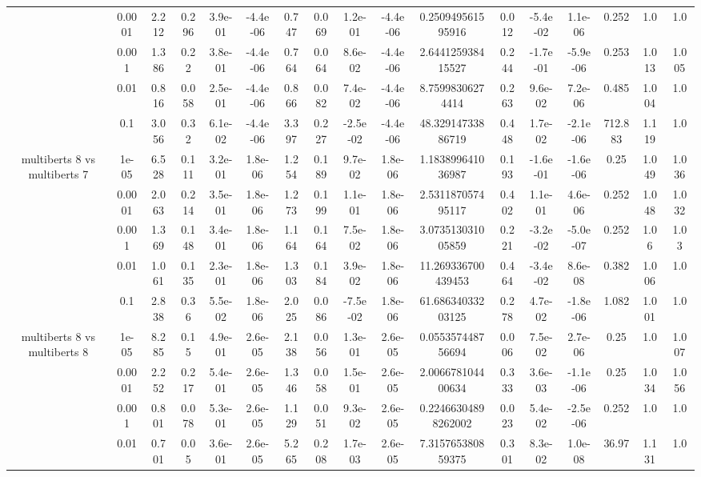 \begin{tabular}{|c|c|c|c|c|c|c|c|c|c|c|c|c|c|c|c|c|}
 & 0.0001 & 2.212 & 0.296 & 3.9e-01 & -4.4e-06 & 0.747 & 0.069 & 1.2e-01 & -4.4e-06 & 0.250949561595916 & 0.012 & -5.4e-02 & 1.1e-06 & 0.252 & 1.0 & 1.0 \\
 & 0.001 & 1.386 & 0.22 & 3.8e-01 & -4.4e-06 & 0.764 & 0.064 & 8.6e-02 & -4.4e-06 & 2.644125938415527 & 0.244 & -1.7e-01 & -5.9e-06 & 0.253 & 1.013 & 1.005 \\
 & 0.01 & 0.816 & 0.058 & 2.5e-01 & -4.4e-06 & 0.866 & 0.082 & 7.4e-02 & -4.4e-06 & 8.75998306274414 & 0.263 & 9.6e-02 & 7.2e-06 & 0.485 & 1.004 & 1.0 \\
 & 0.1 & 3.056 & 0.32 & 6.1e-02 & -4.4e-06 & 3.397 & 0.227 & -2.5e-02 & -4.4e-06 & 48.32914733886719 & 0.448 & 1.7e-02 & -2.1e-06 & 712.883 & 1.119 & 1.0 \\
\hline
\multirow{5}{*}{multiberts 8 vs multiberts 7} & 1e-05 & 6.528 & 0.111 & 3.2e-01 & 1.8e-06 & 1.254 & 0.189 & 9.7e-02 & 1.8e-06 & 1.183899641036987 & 0.193 & -1.6e-01 & -1.6e-06 & 0.25 & 1.049 & 1.036 \\
 & 0.0001 & 2.063 & 0.214 & 3.5e-01 & 1.8e-06 & 1.273 & 0.199 & 1.1e-01 & 1.8e-06 & 2.531187057495117 & 0.402 & 1.1e-01 & 4.6e-06 & 0.252 & 1.048 & 1.032 \\
 & 0.001 & 1.369 & 0.148 & 3.4e-01 & 1.8e-06 & 1.164 & 0.164 & 7.5e-02 & 1.8e-06 & 3.073513031005859 & 0.221 & -3.2e-02 & -5.0e-07 & 0.252 & 1.06 & 1.03 \\
 & 0.01 & 1.061 & 0.135 & 2.3e-01 & 1.8e-06 & 1.303 & 0.184 & 3.9e-02 & 1.8e-06 & 11.269336700439453 & 0.464 & -3.4e-02 & 8.6e-08 & 0.382 & 1.006 & 1.0 \\
 & 0.1 & 2.838 & 0.36 & 5.5e-02 & 1.8e-06 & 2.025 & 0.086 & -7.5e-02 & 1.8e-06 & 61.68634033203125 & 0.278 & 4.7e-02 & -1.8e-06 & 1.082 & 1.001 & 1.0 \\
\hline
\multirow{5}{*}{multiberts 8 vs multiberts 8} & 1e-05 & 8.285 & 0.15 & 4.9e-01 & 2.6e-05 & 2.138 & 0.056 & 1.3e-01 & 2.6e-05 & 0.055357448756694 & 0.006 & 7.5e-02 & 2.7e-06 & 0.25 & 1.0 & 1.007 \\
 & 0.0001 & 2.252 & 0.217 & 5.4e-01 & 2.6e-05 & 1.346 & 0.058 & 1.5e-01 & 2.6e-05 & 2.006678104400634 & 0.333 & 3.6e-03 & -1.1e-06 & 0.25 & 1.034 & 1.056 \\
 & 0.001 & 0.801 & 0.078 & 5.3e-01 & 2.6e-05 & 1.129 & 0.051 & 9.3e-02 & 2.6e-05 & 0.22466304898262002 & 0.023 & 5.4e-02 & -2.5e-06 & 0.252 & 1.0 & 1.0 \\
 & 0.01 & 0.701 & 0.05 & 3.6e-01 & 2.6e-05 & 5.265 & 0.208 & 1.7e-03 & 2.6e-05 & 7.315765380859375 & 0.301 & 8.3e-02 & 1.0e-08 & 36.97 & 1.131 & 1.0 \\

\end{tabular}
